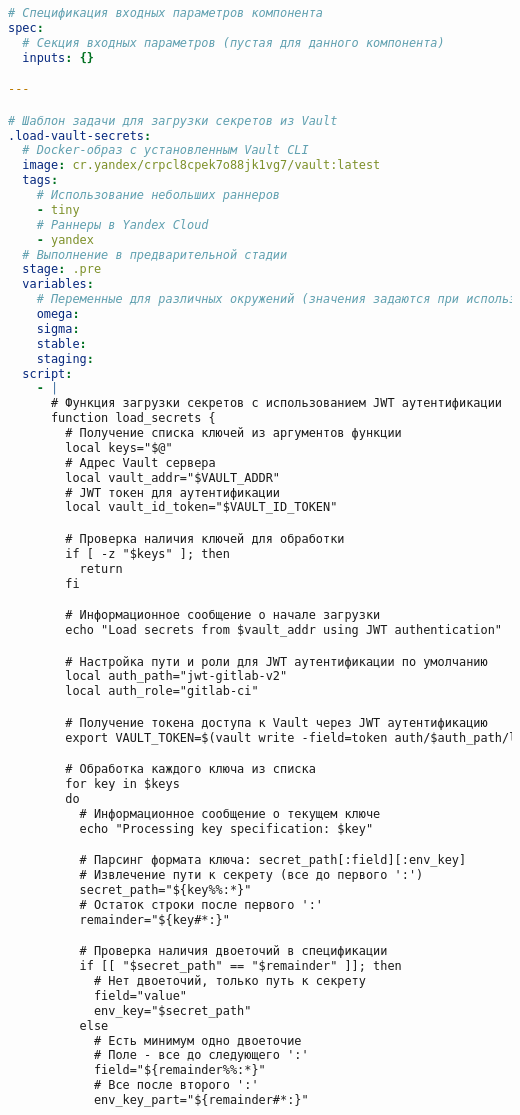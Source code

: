 \begin{lstlisting}[language=yaml,label={lst:component-template},caption={Компонентный шаблон для load-vault-secret}]
# Спецификация входных параметров компонента
spec:
  # Секция входных параметров (пустая для данного компонента)
  inputs: {}

---

# Шаблон задачи для загрузки секретов из Vault
.load-vault-secrets:
  # Docker-образ с установленным Vault CLI
  image: cr.yandex/crpcl8cpek7o88jk1vg7/vault:latest
  tags:
    # Использование небольших раннеров
    - tiny
    # Раннеры в Yandex Cloud
    - yandex
  # Выполнение в предварительной стадии
  stage: .pre
  variables:
    # Переменные для различных окружений (значения задаются при использовании)
    omega:
    sigma:
    stable:
    staging:
  script:
    - |
      # Функция загрузки секретов с использованием JWT аутентификации
      function load_secrets {
        # Получение списка ключей из аргументов функции
        local keys="$@"
        # Адрес Vault сервера
        local vault_addr="$VAULT_ADDR"
        # JWT токен для аутентификации
        local vault_id_token="$VAULT_ID_TOKEN"

        # Проверка наличия ключей для обработки
        if [ -z "$keys" ]; then
          return
        fi

        # Информационное сообщение о начале загрузки
        echo "Load secrets from $vault_addr using JWT authentication"

        # Настройка пути и роли для JWT аутентификации по умолчанию
        local auth_path="jwt-gitlab-v2"
        local auth_role="gitlab-ci"

        # Получение токена доступа к Vault через JWT аутентификацию
        export VAULT_TOKEN=$(vault write -field=token auth/$auth_path/login role=$auth_role jwt=$vault_id_token)

        # Обработка каждого ключа из списка
        for key in $keys
        do
          # Информационное сообщение о текущем ключе
          echo "Processing key specification: $key"

          # Парсинг формата ключа: secret_path[:field][:env_key]
          # Извлечение пути к секрету (все до первого ':')
          secret_path="${key%%:*}"
          # Остаток строки после первого ':'
          remainder="${key#*:}"

          # Проверка наличия двоеточий в спецификации
          if [[ "$secret_path" == "$remainder" ]]; then
            # Нет двоеточий, только путь к секрету
            field="value"
            env_key="$secret_path"
          else
            # Есть минимум одно двоеточие
            # Поле - все до следующего ':'
            field="${remainder%%:*}"
            # Все после второго ':'
            env_key_part="${remainder#*:}"


\end{lstlisting}
